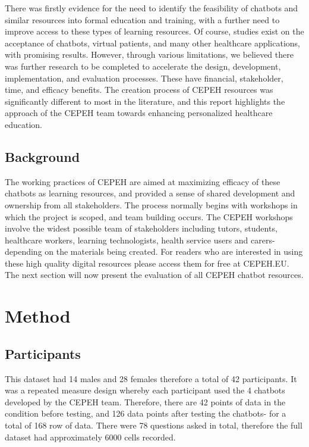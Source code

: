 \documentclass[a4paper, nobind]{templates/ociamthesis}
\begin{document}
There was ﬁrstly evidence for the need to identify the feasibility of chatbots and similar resources into formal education and training, with a further need to improve access to these types of learning resources. Of course, studies exist on the acceptance of chatbots, virtual patients, and many other healthcare applications, with promising results. However, through various limitations, we believed there was further research to be completed to accelerate the design, development, implementation, and evaluation processes. These have ﬁnancial, stakeholder, time, and eﬃcacy beneﬁts. The creation process of CEPEH resources was signiﬁcantly diﬀerent to most in the literature, and this report highlights the approach of the CEPEH team towards enhancing personalized healthcare education.

\hypertarget{sec-background}{%
\section*{Background}\label{sec-background}}

The working practices of CEPEH are aimed at maximizing efficacy of these chatbots as learning resources, and provided a sense of shared development and ownership from all stakeholders. The process normally begins with workshops in which the project is scoped, and team building occurs. The CEPEH workshops involve the widest possible team of stakeholders including tutors, students, healthcare workers, learning technologists, health service users and carers- depending on the materials being created. For readers who are interested in using these high quality digital resources please access them for free at CEPEH.EU. The next section will now present the evaluation of all CEPEH chatbot resources.

\hypertarget{method}{%
\chapter{Method}\label{method}}

\minitoc 

\hypertarget{participants}{%
\section{Participants}\label{participants}}

This dataset had 14 males and 28 females therefore a total of 42 participants.
It was a repeated measure design whereby each participant used the 4 chatbots developed by the CEPEH team.
Therefore, there are 42 points of data in the condition before testing, and 126 data points after testing the chatbots- for a total of 168 row of data. There were 78 questions asked in total, therefore the full dataset had approximately 6000 cells recorded.
\end{document}
